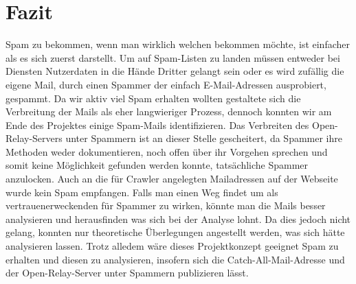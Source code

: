 \documentclass[a4paper,11pt,singlespacing]{article}
\begin{document}
\section{Fazit}\label{sec:Fazit}
Spam zu bekommen, wenn man wirklich welchen bekommen möchte, ist einfacher als es sich zuerst darstellt. Um auf Spam-Listen zu landen müssen entweder bei Diensten Nutzerdaten in die Hände Dritter gelangt sein oder es wird zufällig die eigene Mail, durch einen Spammer der einfach E-Mail-Adressen ausprobiert, gespammt. Da wir aktiv viel Spam erhalten wollten gestaltete sich die Verbreitung der Mails als eher langwieriger Prozess, dennoch konnten wir am Ende des Projektes einige Spam-Mails identifizieren. 
Das Verbreiten des Open-Relay-Servers unter Spammern ist an dieser Stelle gescheitert, da Spammer ihre Methoden weder dokumentieren, noch offen über ihr Vorgehen sprechen und somit keine Möglichkeit gefunden werden konnte, tatsächliche Spammer anzulocken. Auch an die für Crawler angelegten Mailadressen auf der Webseite wurde kein Spam empfangen. Falls man einen Weg findet um als vertrauenerweckenden  für Spammer zu wirken, könnte man die Mails besser  analysieren und herausfinden was sich bei der Analyse lohnt. Da dies jedoch nicht gelang, konnten nur theoretische Überlegungen angestellt werden, was sich hätte analysieren lassen. Trotz alledem wäre dieses Projektkonzept geeignet Spam zu erhalten und diesen zu analysieren, insofern sich die Catch-All-Mail-Adresse und der Open-Relay-Server unter Spammern publizieren lässt.

\newpage




\newpage


\listoffigures
{}
\newpage


\end{document}
